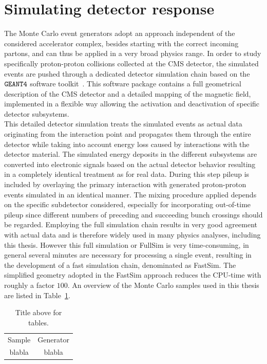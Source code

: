 \section{Simulating detector response} \label{sec::DetectorSim} %
The Monte Carlo event generators adopt an approach independent of the considered accelerator complex, besides starting with the correct incoming partons, and can thus be applied in a very broad physics range. In order to study specifically proton-proton collisions collected at the CMS detector, the simulated events are pushed through a dedicated detector simulation chain based on the $\texttt{GEANT4}$ software toolkit~\cite{}. This software package contains a full geometrical description of the CMS detector and a detailed mapping of the magnetic field, implemented in a flexible way allowing the activation and deactivation of specific detector subsystems.
\\
This detailed detector simulation treats the simulated events as actual data originating from the interaction point and propagates them through the entire detector while taking into account energy loss caused by interactions with the detector material. 
The simulated energy deposits in the different subsystems are converted into electronic signals based on the actual detector behavior resulting in a completely identical treatment as for real data.
During this step pileup is included by overlaying the primary interaction with generated proton-proton events simulated in an identical manner. 
The mixing procedure applied depends on the specific subdetector considered, especially for incorporating out-of-time pileup since different numbers of preceding and succeeding bunch crossings should be regarded.
Employing the full simulation chain results in very good agreement with actual data and is therefore widely used in many physics analyses, including this thesis. However this full simulation or FullSim is very time-consuming, in general several minutes are necessary for processing a single event, resulting in the development of a fast simulation chain, denominated as FastSim. 
The simplified geometry adopted in the FastSim approach reduces the CPU-time with roughly a factor $100$.
An overview of the Monte Carlo samples used in this thesis are listed in Table~\ref{table::Samples}.

\begin{table}[h!t]
 \caption{Title above for tables.} \label{table::Samples}
 \centering
 \begin{tabular}{|c|c|}
  \hline
  Sample & Generator \\
  blabla & blabla \\
  \hline
 \end{tabular}
\end{table}

